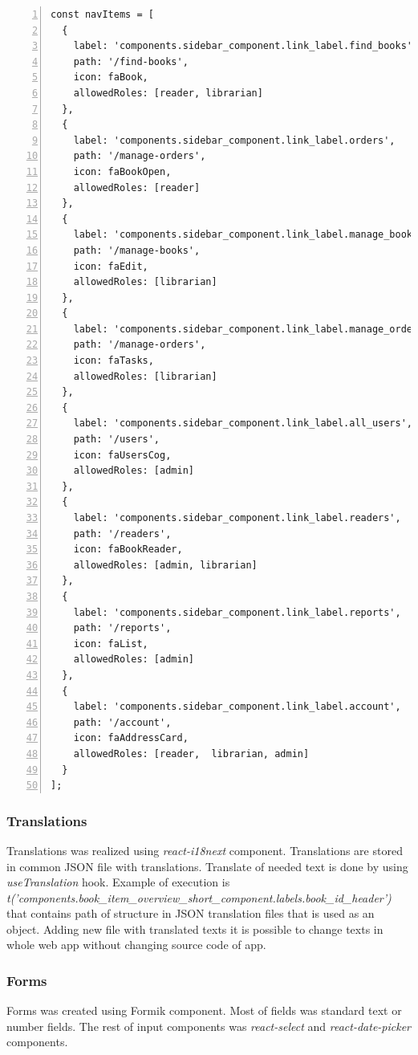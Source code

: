 \begin{lstlisting}[breaklines=true, numbers=left, stepnumber=1, label={lst:GUISidebarElements}, caption={Sidebar buttons with allowed user types}]
const navItems = [
  {
    label: 'components.sidebar_component.link_label.find_books',
    path: '/find-books',
    icon: faBook,
    allowedRoles: [reader, librarian]
  },
  {
    label: 'components.sidebar_component.link_label.orders',
    path: '/manage-orders',
    icon: faBookOpen,
    allowedRoles: [reader]
  },
  {
    label: 'components.sidebar_component.link_label.manage_books',
    path: '/manage-books',
    icon: faEdit,
    allowedRoles: [librarian]
  },
  {
    label: 'components.sidebar_component.link_label.manage_orders',
    path: '/manage-orders',
    icon: faTasks,
    allowedRoles: [librarian]
  },
  {
    label: 'components.sidebar_component.link_label.all_users',
    path: '/users',
    icon: faUsersCog,
    allowedRoles: [admin]
  },
  {
    label: 'components.sidebar_component.link_label.readers',
    path: '/readers',
    icon: faBookReader,
    allowedRoles: [admin, librarian]
  },
  {
    label: 'components.sidebar_component.link_label.reports',
    path: '/reports',
    icon: faList,
    allowedRoles: [admin]
  },
  {
    label: 'components.sidebar_component.link_label.account',
    path: '/account',
    icon: faAddressCard,
    allowedRoles: [reader,  librarian, admin]
  }
];
\end{lstlisting}

\subsubsection{Translations}
Translations was realized using \textit{react-i18next} component. Translations are stored in common JSON file with translations. Translate of needed text is done by using \textit{useTranslation} hook. Example of execution is \textit{t('components.book\_item\_overview\_short\_component.labels.book\_id\_header')} that contains path of structure in JSON translation files that is used as an object. Adding new file with translated texts it is possible to change texts in whole web app without changing source code of app.

\subsubsection{Forms}
Forms was created using Formik component. Most of fields was standard text or number fields. The rest of input components was \textit{react-select} and \textit{react-date-picker} components.

